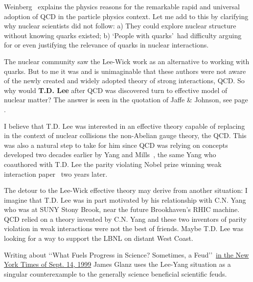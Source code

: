 Weinberg~\cite{Weinberg:QFT} explains the physics reasons for the remarkable rapid and universal adoption of QCD in the particle physics context. Let me add to this by clarifying why nuclear scientists did not follow: a) They could explore nuclear structure without knowing quarks existed; b) \lq People with quarks\rq\ had difficulty arguing for or even justifying the relevance of quarks in nuclear interactions. 
 
The nuclear community saw the Lee-Wick work as an alternative to working with quarks. But to me it was and is unimaginable that these authors were not aware of the newly created and widely adopted theory of strong interactions, QCD. So why would \textbf{T.D. Lee} after QCD was discovered turn to effective model of nuclear matter? The answer is seen in the quotation of Jaffe \& Johnson, see page \pageref{JaJo}. 

I believe that T.D. Lee was interested in an effective theory capable of replacing in the context of nuclear collisions the non-Abelian gauge theory, the QCD. This was also a natural step to take for him since QCD was relying on concepts developed two decades earlier by Yang and Mills~\cite{Yang:1954ek}, the same Yang who coauthored with T.D. Lee the parity violating Nobel prize winning weak interaction paper~\cite{Lee:1956qn} two years later.

The detour to the Lee-Wick effective theory may derive from another situation: I imagine that T.D. Lee was in part motivated by his relationship with C.N. Yang who was at SUNY Stony Brook, near the future Brookhaven’s RHIC machine. QCD relied on a theory invented by C.N. Yang and these two inventors of parity violation in weak interactions were not the best of friends. Maybe T.D. Lee was looking for a way to support the LBNL on distant West Coast.

Writing about \lq\lq What Fuels Progress in Science? Sometimes, a Feud\rq\rq\ \href{https://www.nytimes.com/1999/09/14/science/what-fuels-progress-in-science-sometimes-a-feud.html}{in the New York Times of Sept. 14, 1999} James Glanz uses the Lee-Yang situation as a singular counterexample to the generally science beneficial scientific feuds.\\


